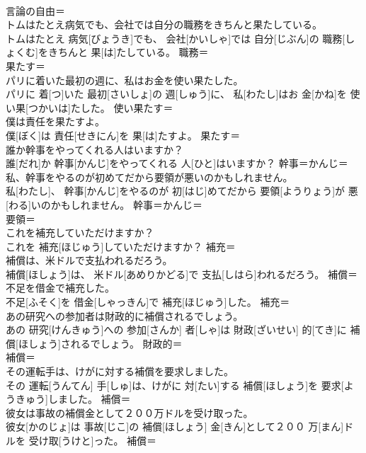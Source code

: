 \documentclass[8pt]{extreport}
\begin{document}
\begin{CJK}{UTF8}{min}
\\	言論の自由＝ 
\\	トムはたとえ病気でも、会社では自分の職務をきちんと果たしている。	
\\	トムはたとえ 病気[びょうき]でも、 会社[かいしゃ]では 自分[じぶん]の 職務[しょくむ]をきちんと 果[は]たしている。	職務＝ 
\\	果たす＝ 
\\	パリに着いた最初の週に、私はお金を使い果たした。	
\\	パリに 着[つ]いた 最初[さいしょ]の 週[しゅう]に、 私[わたし]はお 金[かね]を 使い果[つかいは]たした。	使い果たす＝ 
\\	僕は責任を果たすよ。	
\\	僕[ぼく]は 責任[せきにん]を 果[は]たすよ。	果たす＝ 
\\	誰か幹事をやってくれる人はいますか？	
\\	誰[だれ]か 幹事[かんじ]をやってくれる 人[ひと]はいますか？	幹事＝かんじ＝ 
\\	私、幹事をやるのが初めてだから要領が悪いのかもしれません。	
\\	私[わたし]、 幹事[かんじ]をやるのが 初[はじ]めてだから 要領[ようりょう]が 悪[わる]いのかもしれません。	幹事＝かんじ＝ 
\\	要領＝ 
\\	これを補充していただけますか？	
\\	これを 補充[ほじゅう]していただけますか？	補充＝ 
\\	補償は、米ドルで支払われるだろう。	
\\	補償[ほしょう]は、 米ドル[あめりかどる]で 支払[しはら]われるだろう。	補償＝ 
\\	不足を借金で補充した。	
\\	不足[ふそく]を 借金[しゃっきん]で 補充[ほじゅう]した。	補充＝ 
\\	あの研究への参加者は財政的に補償されるでしょう。	
\\	あの 研究[けんきゅう]への 参加[さんか] 者[しゃ]は 財政[ざいせい] 的[てき]に 補償[ほしょう]されるでしょう。	財政的＝ 
\\	補償＝ 
\\	その運転手は、けがに対する補償を要求しました。	
\\	その 運転[うんてん] 手[しゅ]は、けがに 対[たい]する 補償[ほしょう]を 要求[ようきゅう]しました。	補償＝ 
\\	彼女は事故の補償金として２００万ドルを受け取った。	
\\	彼女[かのじょ]は 事故[じこ]の 補償[ほしょう] 金[きん]として２００ 万[まん]ドルを 受け取[うけと]った。	補償＝ 

\end{CJK}
\end{document}
